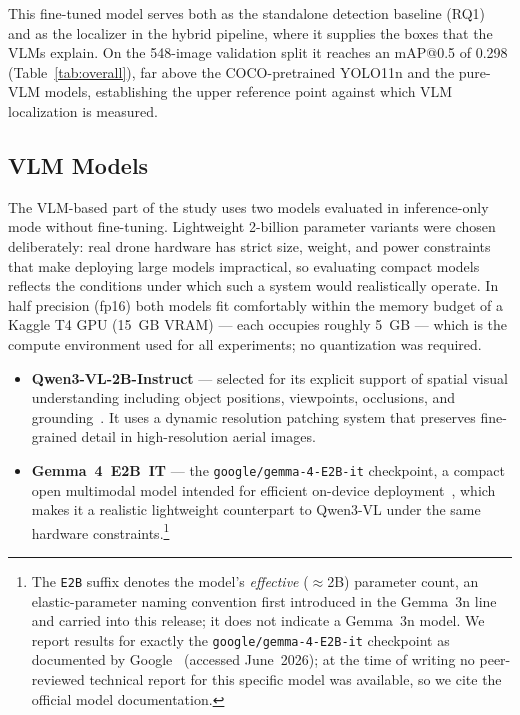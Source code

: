 \documentclass[acmtog, authorversion]{acmart}
\begin{document}
This fine-tuned model serves both as the standalone detection baseline
(RQ1) and as the localizer in the hybrid pipeline, where it supplies the
boxes that the VLMs explain. On the 548-image validation split it
reaches an mAP@0.5 of 0.298 (Table~\ref{tab:overall}), far above the
COCO-pretrained YOLO11n and the pure-VLM models, establishing the upper
reference point against which VLM localization is measured.

\subsection{VLM Models}

The VLM-based part of the study uses two models evaluated in
inference-only mode without fine-tuning. Lightweight 2-billion
parameter variants were chosen deliberately: real drone hardware
has strict size, weight, and power constraints that make deploying
large models impractical, so evaluating compact models reflects the
conditions under which such a system would realistically operate.
In half precision (fp16) both models fit comfortably within the
memory budget of a Kaggle T4 GPU (15~GB VRAM) --- each occupies
roughly 5~GB --- which is the compute environment used for all
experiments; no quantization was required.

\begin{itemize}
  \item \textbf{Qwen3-VL-2B-Instruct} --- selected for its explicit
    support of spatial visual understanding including object positions,
    viewpoints, occlusions, and grounding~\cite{bai2025qwen3vl,
    wang2024qwen2vl}. It uses a dynamic resolution
    patching system that preserves fine-grained detail in high-resolution
    aerial images.
  \item \textbf{Gemma~4~E2B~IT} --- the \texttt{google/gemma-4-E2B-it}
    checkpoint, a compact open multimodal model intended for efficient
    on-device deployment~\cite{google2026gemma4}, which makes it a
    realistic lightweight counterpart to Qwen3-VL under the same hardware
    constraints.\footnote{The \texttt{E2B} suffix denotes the model's
    \emph{effective} ($\approx$2B) parameter count, an elastic-parameter
    naming convention first introduced in the Gemma~3n line and carried
    into this release; it does not indicate a Gemma~3n model. We report
    results for exactly the \texttt{google/gemma-4-E2B-it} checkpoint as
    documented by Google~\cite{google2026gemma4} (accessed June~2026); at
    the time of writing no peer-reviewed technical report for this
    specific model was available, so we cite the official model
    documentation.}
\end{itemize}
\end{document}
